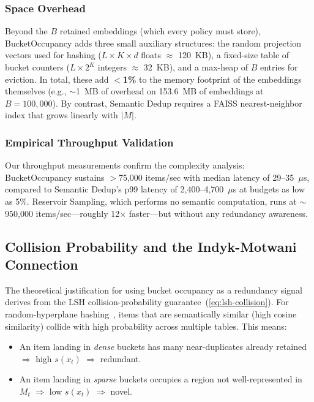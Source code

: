 \documentclass[conference]{IEEEtran}
\begin{document}
\subsubsection{Space Overhead}
Beyond the $B$ retained embeddings (which every policy must store),
BucketOccupancy adds three small auxiliary structures: the random
projection vectors used for hashing ($L \times K \times d$ floats
$\approx$ 120~KB), a fixed-size table of bucket counters
($L \times 2^K$ integers $\approx$ 32~KB), and a max-heap of $B$
entries for eviction. In total, these add $<$\textbf{1\%} to the
memory footprint of the embeddings themselves (e.g., $\sim$1~MB of
overhead on 153.6~MB of embeddings at $B{=}100{,}000$). By contrast,
Semantic Dedup requires a FAISS nearest-neighbor index that grows
linearly with $|M|$.

\subsubsection{Empirical Throughput Validation}
Our throughput measurements confirm the complexity analysis:
BucketOccupancy sustains $>$75,000 items/sec with median latency of
29--35~$\mu$s, compared to Semantic Dedup's p99 latency of
2,400--4,700~$\mu$s at budgets as low as 5\%. Reservoir Sampling, which
performs no semantic computation, runs at $\sim$950,000 items/sec---roughly
12$\times$ faster---but without any redundancy awareness.

\subsection{Collision Probability and the Indyk-Motwani Connection}
\label{sec:indyk-motwani}
The theoretical justification for using bucket occupancy as a
redundancy signal derives from the LSH collision-probability
guarantee~(\ref{eq:lsh-collision}). For random-hyperplane
hashing~\cite{b14}, items that are semantically similar (high cosine
similarity) collide with high probability across multiple tables. This
means:
\begin{itemize}
\item An item landing in \emph{dense} buckets has many near-duplicates
      already retained $\Rightarrow$ high $s(x_t)$ $\Rightarrow$
      redundant.
\item An item landing in \emph{sparse} buckets occupies a region not
      well-represented in $M_t$ $\Rightarrow$ low $s(x_t)$
      $\Rightarrow$ novel.
\end{itemize}
\end{document}
